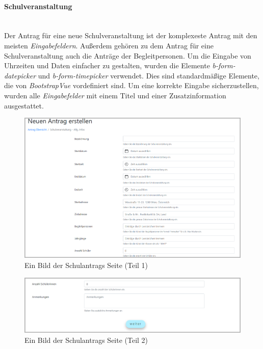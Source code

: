 \paragraph{Schulveranstaltung}
~\\
Der Antrag für eine neue Schulveranstaltung ist der komplexeste Antrag mit den meisten \textit{Eingabefeldern}. Außerdem gehören zu dem Antrag für eine Schulveranstaltung auch die Anträge der Begleitpersonen. Um die Eingabe von Uhrzeiten und Daten einfacher zu gestalten, wurden die Elemente \textit{b-form-datepicker} und \textit{b-form-timepicker} verwendet. Dies sind standardmäßige Elemente, die von \textit{BootstrapVue} vordefiniert sind. Um eine korrekte Eingabe sicherzustellen, wurden alle \textit{Eingabefelder} mit einem Titel und einer Zusatzinformation ausgestattet.
\begin{figure}[H]
	\centering
	\includegraphics[width=1\linewidth]{images/ldehner_implementierung/schul_1}
	\caption[Neuer Schulantrag Seite (Teil 1)]{Ein Bild der Schulantrags Seite (Teil 1)}
	\label{fig:schulantrag1}
\end{figure}
\begin{figure}[H]
	\centering
	\includegraphics[width=1\linewidth]{images/ldehner_implementierung/schul_2}
	\caption[Neuer Schulantrag Seite (Teil 2)]{Ein Bild der Schulantrags Seite (Teil 2)}
	\label{fig:schulantrag2}
\end{figure}
